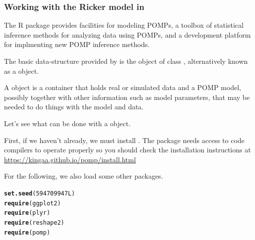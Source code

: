 \documentclass{beamer}\usepackage[]{graphicx}\usepackage[]{color}
\makeatletter
\newcommand{\hlnum}[1]{\textcolor[rgb]{0.686,0.059,0.569}{#1}}%
\newcommand{\hlstd}[1]{\textcolor[rgb]{0.345,0.345,0.345}{#1}}%
\newcommand{\hlkwd}[1]{\textcolor[rgb]{0.737,0.353,0.396}{\textbf{#1}}}%
\newenvironment{kframe}{%
 \def\at@end@of@kframe{}%
 \ifinner\ifhmode%
  \def\at@end@of@kframe{\end{minipage}}%
  \begin{minipage}{\columnwidth}%
 \fi\fi%
 \def\FrameCommand##1{\hskip\@totalleftmargin \hskip-\fboxsep
 \colorbox{shadecolor}{##1}\hskip-\fboxsep
     \hskip-\linewidth \hskip-\@totalleftmargin \hskip\columnwidth}%
 \MakeFramed {\advance\hsize-\width
   \@totalleftmargin\z@ \linewidth\hsize
   \@setminipage}}%
 {\par\unskip\endMakeFramed%
 \at@end@of@kframe}
\newenvironment{knitrout}{}{} %
\makeatother
\begin{document}
\begin{frame}[fragile] 

\frametitle{Working with the Ricker model in }

\bi

\item The  R  package  provides facilities for modeling POMPs, a toolbox of statistical inference methods for analyzing data using POMPs, and a development platform for implmenting new POMP inference methods.

\item The basic data-structure provided by  is the object of class , alternatively known as a  object.

\item A  object is a container that holds real or simulated data and a POMP model, possibly together with other information such as model parameters, that may be needed to do things with the model and data.

\item Let's see what can be done with a  object.

\item First, if we haven't already, we must install . The package needs access to code compilers to operate properly so you should check the installation instructions at
\url{https://kingaa.github.io/pomp/install.html}

\ei

\end{frame}

\begin{frame}[fragile]
\bi
\item For the following, we also load some other packages.
\ei
\begin{knitrout}\small
{}\color{fgcolor}\begin{kframe}
\begin{alltt}
\hlkwd{set.seed}\hlstd{(}\hlnum{594709947L}\hlstd{)}
\hlkwd{require}\hlstd{(ggplot2)}
\hlkwd{require}\hlstd{(plyr)}
\hlkwd{require}\hlstd{(reshape2)}
\hlkwd{require}\hlstd{(pomp)}
\end{alltt}
\end{kframe}
\end{knitrout}

\end{frame}
\end{document}
